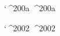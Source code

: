 

\iftexforht {} {
    \newunicodechar { } {%
        \iffontchar\font `^^^^200a {%
            ^^^^200a%
        }\fi%
    }
}


\iftexforht {
    \renewcommand {\enspace} {^^^^2002}
} {
    \newunicodechar { } {%
        \iffontchar\font `^^^^2002 {%
            ^^^^2002%
        }\else{%
            \enspace%
        }\fi%
    }
}




